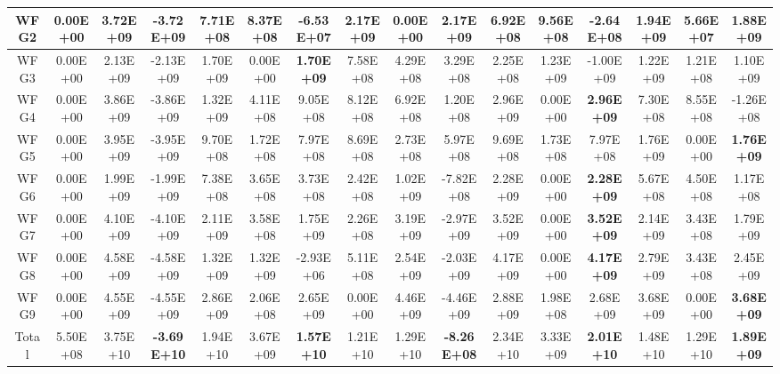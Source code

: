 \begin{table}[h]
{\begin{tabular}{|c|c|c|c|c|c|c|c|c|c|c|c|c|c|c|c|}
WFG2 & 0.00E+00 & 3.72E+09 & -3.72E+09 & 7.71E+08 & 8.37E+08 & -6.53E+07 & 2.17E+09 & 0.00E+00 & \textbf{2.17E+09} & 6.92E+08 & 9.56E+08 & -2.64E+08 & 1.94E+09 & 5.66E+07 & 1.88E+09 \\ \hline
WFG3 & 0.00E+00 & 2.13E+09 & -2.13E+09 & 1.70E+09 & 0.00E+00 & \textbf{1.70E+09} & 7.58E+08 & 4.29E+08 & 3.29E+08 & 2.25E+08 & 1.23E+09 & -1.00E+09 & 1.22E+09 & 1.21E+08 & 1.10E+09 \\ \hline
WFG4 & 0.00E+00 & 3.86E+09 & -3.86E+09 & 1.32E+09 & 4.11E+08 & 9.05E+08 & 8.12E+08 & 6.92E+08 & 1.20E+08 & 2.96E+09 & 0.00E+00 & \textbf{2.96E+09} & 7.30E+08 & 8.55E+08 & -1.26E+08 \\ \hline
WFG5 & 0.00E+00 & 3.95E+09 & -3.95E+09 & 9.70E+08 & 1.72E+08 & 7.97E+08 & 8.69E+08 & 2.73E+08 & 5.97E+08 & 9.69E+08 & 1.73E+08 & 7.97E+08 & 1.76E+09 & 0.00E+00 & \textbf{1.76E+09} \\ \hline
WFG6 & 0.00E+00 & 1.99E+09 & -1.99E+09 & 7.38E+08 & 3.65E+08 & 3.73E+08 & 2.42E+08 & 1.02E+09 & -7.82E+08 & 2.28E+09 & 0.00E+00 & \textbf{2.28E+09} & 5.67E+08 & 4.50E+08 & 1.17E+08 \\ \hline
WFG7 & 0.00E+00 & 4.10E+09 & -4.10E+09 & 2.11E+09 & 3.58E+08 & 1.75E+09 & 2.26E+08 & 3.19E+09 & -2.97E+09 & 3.52E+09 & 0.00E+00 & \textbf{3.52E+09} & 2.14E+09 & 3.43E+08 & 1.79E+09 \\ \hline
WFG8 & 0.00E+00 & 4.58E+09 & -4.58E+09 & 1.32E+09 & 1.32E+09 & -2.93E+06 & 5.11E+08 & 2.54E+09 & -2.03E+09 & 4.17E+09 & 0.00E+00 & \textbf{4.17E+09} & 2.79E+09 & 3.43E+08 & 2.45E+09 \\ \hline
WFG9 & 0.00E+00 & 4.55E+09 & -4.55E+09 & 2.86E+09 & 2.06E+08 & 2.65E+09 & 0.00E+00 & 4.46E+09 & -4.46E+09 & 2.88E+09 & 1.98E+08 & 2.68E+09 & 3.68E+09 & 0.00E+00 & \textbf{3.68E+09} \\ \hline
Total & 5.50E+08 & 3.75E+10 & \textbf{-3.69E+10} & 1.94E+10 & 3.67E+09 & \textbf{1.57E+10} & 1.21E+10 & 1.29E+10 & \textbf{-8.26E+08} & 2.34E+10 & 3.33E+09 & \textbf{2.01E+10} & 1.48E+10 & 1.29E+10 & \textbf{1.89E+09} \\ \hline
\end{tabular}%
}
\end{table}

